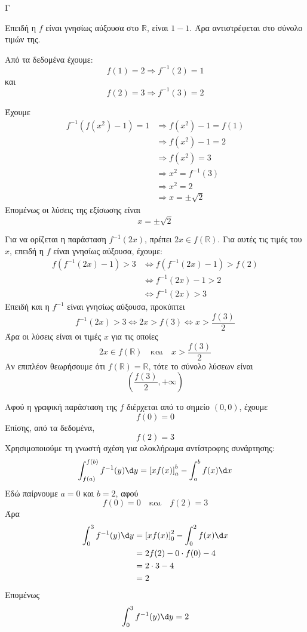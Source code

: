\begin{thema}{Γ}
\begin{erwthma}
\item Επειδή η $f$ είναι γνησίως αύξουσα στο $\mathbb{R}$, είναι $1-1$.
Άρα αντιστρέφεται στο σύνολο τιμών της.

Από τα δεδομένα έχουμε:
\[f(1)=2\Rightarrow f^{-1}(2)=1\]
και
\[f(2)=3\Rightarrow f^{-1}(3)=2\]

\item Έχουμε
\begin{align*}
f^{-1}(f(x^2)-1)=1
&\Rightarrow f(x^2)-1=f(1)\\
&\Rightarrow f(x^2)-1=2\\
&\Rightarrow f(x^2)=3\\
&\Rightarrow x^2=f^{-1}(3)\\
&\Rightarrow x^2=2\\
&\Rightarrow x=\pm\sqrt{2}
\end{align*}
Επομένως οι λύσεις της εξίσωσης είναι
\[x=\pm\sqrt{2}\]

\item Για να ορίζεται η παράσταση $f^{-1}(2x)$, πρέπει $2x\in f(\mathbb{R})$.
Για αυτές τις τιμές του $x$, επειδή η $f$ είναι γνησίως αύξουσα, έχουμε:
\begin{align*}
f(f^{-1}(2x)-1)>3
&\Leftrightarrow f(f^{-1}(2x)-1)>f(2)\\
&\Leftrightarrow f^{-1}(2x)-1>2\\
&\Leftrightarrow f^{-1}(2x)>3
\end{align*}
Επειδή και η $f^{-1}$ είναι γνησίως αύξουσα, προκύπτει
\[f^{-1}(2x)>3\Leftrightarrow 2x>f(3)\Leftrightarrow x>\frac{f(3)}{2}\]
Άρα οι λύσεις είναι οι τιμές $x$ για τις οποίες
\[2x\in f(\mathbb{R})\quad\text{και}\quad x>\frac{f(3)}{2}\]
Αν επιπλέον θεωρήσουμε ότι $f(\mathbb{R})=\mathbb{R}$, τότε το σύνολο λύσεων είναι
\[\left(\frac{f(3)}{2},+\infty\right)\]

\item Αφού η γραφική παράσταση της $f$ διέρχεται από το σημείο $(0,0)$, έχουμε
\[f(0)=0\]
Επίσης, από τα δεδομένα,
\[f(2)=3\]
Χρησιμοποιούμε τη γνωστή σχέση για ολοκλήρωμα αντίστροφης συνάρτησης:
\[\dint_{f(a)}^{f(b)}f^{-1}(y)\d y=\left[xf(x)\right]_a^b-\dint_a^b f(x)\d x\]
Εδώ παίρνουμε $a=0$ και $b=2$, αφού
\[f(0)=0\quad\text{και}\quad f(2)=3\]
Άρα
\begin{align*}
\dint_0^3 f^{-1}(y)\d y
&=\left[xf(x)\right]_0^2-\dint_0^2 f(x)\d x\\
&=2f(2)-0\cdot f(0)-4\\
&=2\cdot 3-4\\
&=2
\end{align*}
Επομένως
\[\dint_0^3 f^{-1}(y)\d y=2\]
\end{erwthma}
\end{thema}

